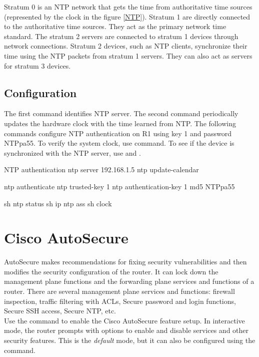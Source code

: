 Stratum 0 is an NTP network that gets the time from authoritative time sources (represented by the clock in the figure \ref{NTP}). Stratum 1 are directly connected to the authoritative time sources. They act as the primary network time standard. The stratum 2 servers are connected to stratum 1 devices through network connections. Stratum 2 devices, such as NTP clients, synchronize their time using the NTP packets from stratum 1 servers. They can also act as servers for stratum 3 devices.

\subsection{Configuration}

The first command identifies NTP server.  The second command periodically updates the hardware clock with the time learned from NTP. The following commands configure NTP authentication on R1 using key 1 and password NTPpa55. To verify the system clock, use  command. To see if the device is synchronized with the NTP server, use  and .

\begin{sexylisting}{NTP authentication}
ntp server 192.168.1.5
ntp update-calendar

ntp authenticate
ntp trusted-key 1
ntp authentication-key 1 md5 NTPpa55

sh ntp status
sh ip ntp ass
sh clock
\end{sexylisting}

\section{Cisco AutoSecure}

AutoSecure makes recommendations for fixing security vulnerabilities and then modifies the security configuration of the router. It can lock down the management plane functions and the forwarding plane services and functions of a router. There are several management plane services and functions: firewall inspection, traffic filtering with ACLs, Secure password and login functions, Secure SSH access, Secure NTP, etc.\\

Use the  command to enable the Cisco AutoSecure feature setup. In interactive mode, the router prompts with options to enable and disable services and other security features. This is the \emph{default} mode, but it can also be configured using the  command.\\

